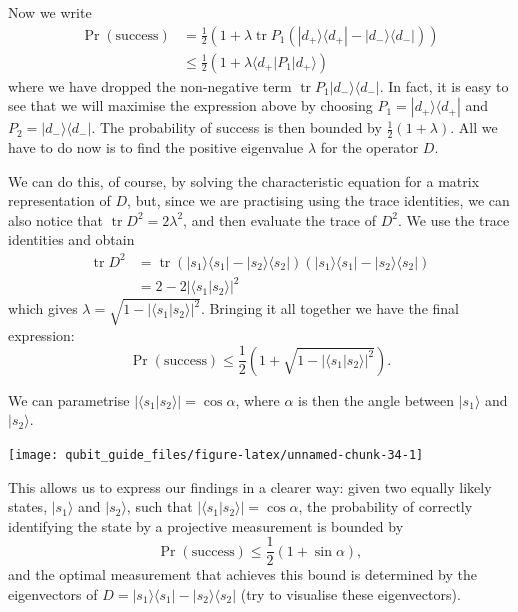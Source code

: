 \documentclass[fleqn,a4paper]{article}
\renewcommand{\footnote}[1]{\sidenotetext[{\color{white}0}\!\!]{\footnotesize #1}}
\theoremstyle{definition}
\theoremstyle{definition}
\theoremstyle{definition}
\theoremstyle{definition}
\theoremstyle{remark}
\begin{document}
Now we write
\[
\begin{aligned}
  \Pr (\text{success})
  &= \frac{1}{2}\left(
      1 + \lambda\operatorname{tr}P_1\left( |d_+\rangle\langle d_+|-|d_-\rangle\langle d_-| \right)
    \right)
\\&\leqslant\frac{1}{2}\left(
      1+\lambda \langle d_+|P_1|d_+\rangle
    \right)
\end{aligned}
\]
where we have dropped the non-negative term \(\operatorname{tr}P_1|d_-\rangle\langle d_-|\).
In fact, it is easy to see that we will maximise the expression above by choosing \(P_1 = |d_+\rangle\langle d_+|\) and \(P_2 = |d_-\rangle\langle d_-|\).
The probability of success is then bounded by \(\frac{1}{2}(1+\lambda)\).
All we have to do now is to find the positive eigenvalue \(\lambda\) for the operator \(D\).

We can do this, of course, by solving the characteristic equation for a matrix representation of \(D\), but, since we are practising using the trace identities, we can also notice that \(\operatorname{tr}D^2 = 2\lambda^2\), and then evaluate the trace of \(D^2\).
We use the trace identities and obtain
\[
  \begin{aligned}
    \operatorname{tr}D^2
    &= \operatorname{tr}\left( |s_1\rangle\langle s_1|-|s_2\rangle\langle s_2| \right) \left( |s_1\rangle\langle s_1|-|s_2\rangle\langle s_2| \right)
  \\&= 2-2|\langle s_1|s_2\rangle|^2
  \end{aligned}
\]
which gives \(\lambda = \sqrt{1-|\langle s_1|s_2\rangle|^2}\).
Bringing it all together we have the final expression:
\[
 \Pr (\text{success})
 \leqslant\frac{1}{2}\left( 1+ \sqrt{1-|\langle s_1|s_2\rangle|^2} \right).
\]

We can parametrise \(|\langle s_1|s_2\rangle| = \cos\alpha\), where \(\alpha\) is then the angle between \(|s_1\rangle\) and \(|s_2\rangle\).

\begin{center}\texttt{[image: qubit\_guide\_files/figure-latex/unnamed-chunk-34-1]} \end{center}

This allows us to express our findings in a clearer way: given two equally likely states, \(|s_1\rangle\) and \(|s_2\rangle\), such that \(|\langle s_1|s_2\rangle| = \cos\alpha\), the probability of correctly identifying the state by a projective measurement is bounded by\footnote{Here we use that \(\cos^2\alpha+\sin^2\alpha=1\) for any \(\alpha\).}
\[
 \Pr (\text{success})
 \leqslant\frac{1}{2}(1 + \sin\alpha),
\]
and the optimal measurement that achieves this bound is determined by the eigenvectors of \(D = |s_1\rangle\langle s_1|-|s_2\rangle\langle s_2|\) (try to visualise these eigenvectors).
\end{document}
